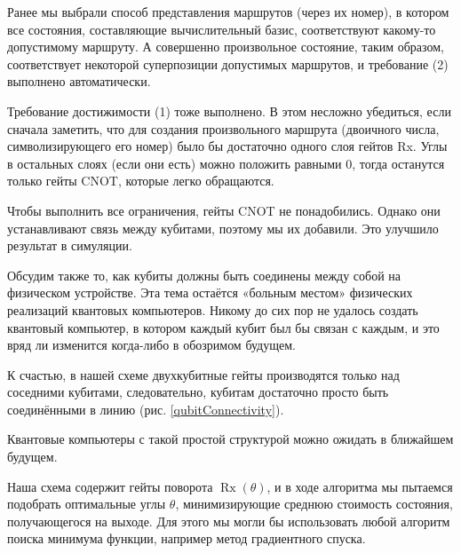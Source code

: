 Ранее мы выбрали способ представления маршрутов (через их номер), в котором все состояния, составляющие вычислительный базис, соответствуют какому-то допустимому маршруту. А совершенно произвольное состояние, таким образом, соответствует некоторой суперпозиции допустимых маршрутов, и требование (2) выполнено автоматически.

Требование достижимости (1) тоже выполнено. В этом несложно убедиться, если сначала заметить, что для создания произвольного маршрута (двоичного числа, символизирующего его номер) было бы достаточно одного слоя гейтов Rx. Углы в остальных слоях (если они есть) можно положить равными 0, тогда останутся только гейты CNOT, которые легко обращаются.


Чтобы выполнить все ограничения, гейты CNOT не понадобились. Однако они устанавливают связь между кубитами, поэтому мы их добавили. Это улучшило результат в симуляции.

Обсудим также то, как кубиты должны быть соединены между собой на физическом устройстве. 
Эта тема остаётся «больным местом» 
физических реализаций квантовых компьютеров. Никому до сих пор не удалось создать квантовый компьютер, в котором каждый кубит был бы связан с каждым, и это вряд ли изменится когда-либо в обозримом будущем.

К счастью, в нашей схеме двухкубитные гейты производятся только над соседними кубитами, следовательно, кубитам достаточно просто быть соединёнными в линию (рис. \ref{qubitConnectivity}).


Квантовые компьютеры с такой простой структурой можно ожидать в ближайшем будущем.



Наша схема содержит гейты поворота $\operatorname{Rx}(\theta)$, и в ходе алгоритма мы пытаемся подобрать оптимальные углы $\theta$, минимизирующие среднюю стоимость состояния, получающегося на выходе. Для этого мы могли бы использовать любой алгоритм поиска минимума функции, например метод градиентного спуска.

